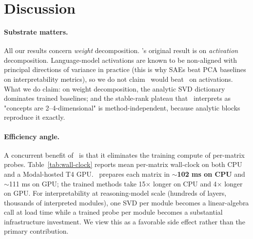 \section{Discussion}
\label{sec:discussion}

\paragraph{Substrate matters.} All our results concern \emph{weight} decomposition. \bsf's original result is on \emph{activation} decomposition. Language-model activations are known to be non-aligned with principal directions of variance in practice (this is why SAEs beat PCA baselines on interpretability metrics), so we do not claim \svdomp\ would beat \bsf\ on activations. What we do claim: on weight decomposition, the analytic SVD dictionary dominates trained baselines; and the stable-rank plateau that \bsf\ interprets as "concepts are 2--4-dimensional" is method-independent, because analytic blocks reproduce it exactly.

\paragraph{Efficiency angle.} A concurrent benefit of \svdomp\ is that it eliminates the training compute of per-matrix probes. Table~\ref{tab:wall-clock} reports mean per-matrix wall-clock on both CPU and a Modal-hosted T4 GPU. \svdomp\ prepares each matrix in \textbf{$\sim$102 ms on CPU} and $\sim$111 ms on GPU; the trained methods take 15$\times$ longer on CPU and 4$\times$ longer on GPU. For interpretability at reasoning-model scale (hundreds of layers, thousands of interpreted modules), one SVD per module becomes a linear-algebra call at load time while a trained probe per module becomes a substantial infrastructure investment. We view this as a favorable side effect rather than the primary contribution.

